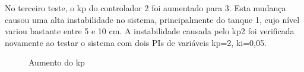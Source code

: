 \documentclass[a4paper,12pt]{article}
\begin{document}
No terceiro teste, o kp do controlador 2 foi aumentado para 3. Esta mudança causou uma alta instabilidade no sistema, principalmente do tanque 1, cujo nível variou bastante entre 5 e 10 cm. A instabilidade causada pelo kp2 foi verificada novamente ao testar o sistema com dois PIs de variáveis kp=2, ki=0,05.

\begin{figure}[H]
     \centering
\hspace{1cm}
     
     \caption{Aumento do kp}
     \label{fig:ControlePI}
\end{figure}
\end{document}
